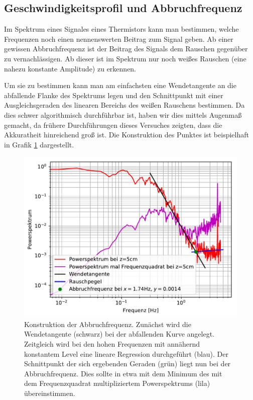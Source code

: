 \documentclass[12pt,a4paper,titlepage,headinclude]{scrartcl}
\numberwithin{equation}{subsection}
\begin{document}
\subsection{Geschwindigkeitsprofil und Abbruchfrequenz}
Im Spektrum eines Signales eines Thermistors kann man bestimmen, welche Frequenzen noch einen nennenswerten Beitrag zum Signal geben.
Ab einer gewissen Abbruchfrequenz ist der Beitrag des Signals dem Rauschen gegenüber zu vernachlässigen.
Ab dieser ist im Spektrum nur noch weißes Rauschen (eine nahezu konstante Amplitude) zu erkennen.

Um sie zu bestimmen kann man am einfachsten eine Wendetangente an die abfallende Flanke des Spektrums legen und den Schnittpunkt mit einer Ausgleichsgeraden des linearen Bereichs des weißen Rauschens bestimmen.
Da dies schwer algorithmisch durchführbar ist, haben wir dies mittels Augenmaß gemacht, da frühere Durchführungen dieses Versuches zeigten, dass die Akkuratheit hinreichend groß ist.
Die Konstruktion des Punktes ist beispielhaft in Grafik \ref{fig:abbruchfreq} dargestellt.

\begin{figure}[h]
	\centering
	\includegraphics[width=0.7\linewidth]{abbruchfrequenz}
	\caption{Konstruktion der Abbruchfrequenz. Zunächst wird die Wendetangente (schwarz) bei der abfallenden Kurve angelegt. Zeitgleich wird bei den hohen Frequenzen mit annähernd konstantem Level eine lineare Regression durchgeführt (blau). Der Schnittpunkt der sich ergebenden Geraden (grün) liegt nun bei der Abbruchfrequenz. Dies sollte in etwa mit dem Minimum des mit dem Frequenzquadrat multipliziertem Powerspektrums (lila) übereinstimmen.}
	\label{fig:abbruchfreq}
\end{figure}
\end{document}
